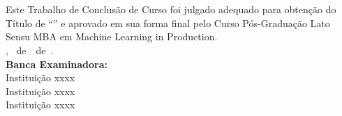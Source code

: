 \imprimircapa


\imprimirfolhaderosto*

\begin{fichacatalografica}
	
\end{fichacatalografica}

\begin{folhadeaprovacao}
	\OnehalfSpacing
	\centering
	\imprimirautor\\%
	\vspace{24pt}		
	\textbf{\imprimirtitulo}%
	\ifnotempty{\imprimirsubtitulo}{:~\imprimirsubtitulo}\\%
	\vspace*{\baselineskip}
	Este Trabalho de Conclusão de Curso foi julgado adequado para obtenção do Título de ``\imprimirformacao'' e aprovado em sua forma final pelo Curso Pós-Graduação Lato Sensu MBA em Machine Learning in Production.\\
	\vspace{12pt}
	\imprimirlocal, \imprimirdia~de~\imprimirmes~de~\imprimirano.\\
	
	\vspace*{18pt}
	\textbf{Banca Examinadora:}\\
	
	\vspace*{24pt}
	\assinatura{\OnehalfSpacing \imprimirbancaa}
	\vspace{6pt}
	Instituição xxxx\\
	
	\vspace*{24pt}
	\assinatura{\OnehalfSpacing \imprimirbancab}
	\vspace{6pt}
	Instituição xxxx\\
	
	\vspace*{24pt}
	\assinatura{\OnehalfSpacing \imprimirbancac}
	\vspace{6pt}
	Instituição xxxx\\
	
\end{folhadeaprovacao}

\ifnotempty{\imprimirdedicatoriatcc}{
\begin{dedicatoria}
	\vspace*{\fill}
	\noindent
	\begin{adjustwidth*}{}{5.5cm} 
		\raggedleft       
		\imprimirdedicatoriatcc
	\end{adjustwidth*}
\end{dedicatoria}
}

